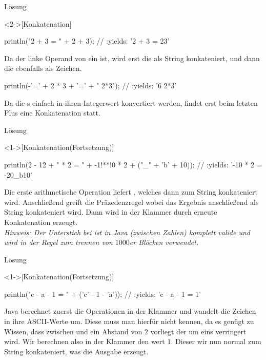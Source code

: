 \begin{frame}[c,fragile]{Lösung}
    \begin{solve}<2->[Konkatenation]
\pause{}
\begin{plainjava}
println("2 + 3 = " + 2 + 3); // :yields: '2 + 3 = 23'
\end{plainjava}
    \pause{}Da der linke Operand von \bjava{+} ein  ist,\pause{} wird erst die  als String konkateniert,\pause{} und dann die  ebenfalls als Zeichen.\pause{}
\begin{plainjava}
println(-'=' + 2 * 3 + '=' + " 2*3"); // :yields: '6 2*3'
\end{plainjava}
    \pause{}Da die s einfach in ihren Integerwert konvertiert werden,\pause{} findet erst beim letzten Plus eine Konkatenation statt.
    \end{solve}
\end{frame}
\begin{frame}[c,fragile]{Lösung}
    \addtocounter{solve}{-1}
    \begin{solve}<1->[Konkatenation\hfill(Fortsetzung)]
\pause{}
\begin{plainjava}
println(2 - 12 + " * 2 = " + -1!**!0 * 2 + ("_" + 'b' + 10));
    // :yields: '-10 * 2 = -20_b10'
\end{plainjava}
    \pause{}Die erste arithmetische Operation liefert ,\pause{} welches dann zum String konkateniert wird.\pause{} Anschließend greift die Präzedenzregel \pause{} wobei das Ergebnis anschließend als String konkateniert wird.\pause{} Dann wird in der Klammer durch erneute Konkatenation  erzeugt.\pause{}\\
    \textit{Hinweis: Der Unterstich bei  ist in Java (zwischen Zahlen) komplett valide\pause{} und wird in der Regel zum trennen von \(1000\)er Blöcken verwendet.}
    \end{solve}
\end{frame}

\begin{frame}[c,fragile]{Lösung}
    \addtocounter{solve}{-1}
    \begin{solve}<1->[Konkatenation\hfill(Fortsetzung)]
\pause{}
\begin{plainjava}
println("c - a - 1 = " + ('c' - 1 - 'a'));
    // :yields: 'c - a - 1 = 1'
\end{plainjava}
    \pause{}Java berechnet zuerst die Operationen in der Klammer und wandelt die Zeichen in ihre ASCII-Werte um.\pause{} Diese muss man hierfür nicht kennen,\pause{} da es genügt zu Wissen, dass zwischen  und  ein Abstand von \(2\) vorliegt der um eins verringert wird.\pause{}
    Wir berechnen also in der Klammer den wert \(1\).\pause{} Dieser wir nun normal zum String konkateniert, was die Ausgabe erzeugt.
    \end{solve}
\end{frame}
\fi